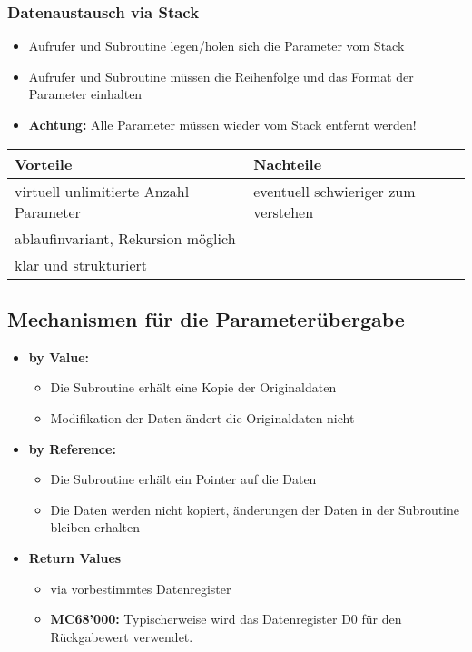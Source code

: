 \subsubsection{Datenaustausch via Stack}
\begin{itemize}
  \item Aufrufer und Subroutine legen/holen sich die Parameter vom Stack
  \item Aufrufer und Subroutine müssen die Reihenfolge und das Format der Parameter einhalten
  \item \textbf{Achtung:} Alle Parameter müssen wieder vom Stack entfernt werden!
\end{itemize}
\begin{tabular}{p{}|l}
	\textbf{Vorteile} 	& \textbf{Nachteile} \\
	\hline
	virtuell unlimitierte Anzahl Parameter	& eventuell schwieriger zum verstehen \\
	ablaufinvariant, Rekursion möglich 		& \\
	klar und strukturiert					&
\end{tabular}


\subsection{Mechanismen für die Parameterübergabe}
\begin{itemize}
  \item \textbf{by Value:}
  	\begin{itemize}
  		\item Die Subroutine erhält eine Kopie der Originaldaten
  		\item Modifikation der Daten ändert die Originaldaten nicht
	\end{itemize}
  \item \textbf{by Reference:}
  	\begin{itemize}
  		\item Die Subroutine erhält ein Pointer auf die Daten
  		\item Die Daten werden nicht kopiert, änderungen der Daten in der Subroutine bleiben erhalten
	\end{itemize}
  \item \textbf{Return Values}
  	\begin{itemize}
  		\item via vorbestimmtes Datenregister
  		\item \textbf{MC68'000:} Typischerweise wird das Datenregister D0 für den Rückgabewert verwendet.
	\end{itemize}
\end{itemize}


